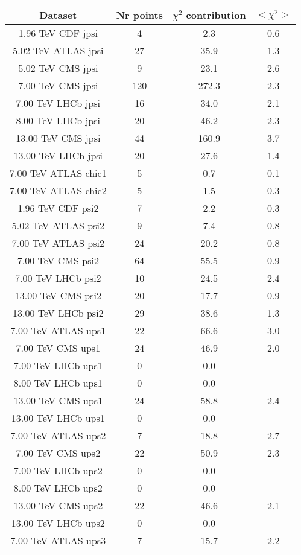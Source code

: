 \begin{table}[h!]
\centering
\begin{tabular}{c|c|c|c}
Dataset & Nr points & $\chi^2$ contribution & $<\chi^2>$ \\
\hline
1.96 TeV CDF jpsi & 4 & 2.3 & 0.6 \\
5.02 TeV ATLAS jpsi & 27 & 35.9 & 1.3 \\
5.02 TeV CMS jpsi & 9 & 23.1 & 2.6 \\
7.00 TeV CMS jpsi & 120 & 272.3 & 2.3 \\
7.00 TeV LHCb jpsi & 16 & 34.0 & 2.1 \\
8.00 TeV LHCb jpsi & 20 & 46.2 & 2.3 \\
13.00 TeV CMS jpsi & 44 & 160.9 & 3.7 \\
13.00 TeV LHCb jpsi & 20 & 27.6 & 1.4 \\
7.00 TeV ATLAS chic1 & 5 & 0.7 & 0.1 \\
7.00 TeV ATLAS chic2 & 5 & 1.5 & 0.3 \\
1.96 TeV CDF psi2 & 7 & 2.2 & 0.3 \\
5.02 TeV ATLAS psi2 & 9 & 7.4 & 0.8 \\
7.00 TeV ATLAS psi2 & 24 & 20.2 & 0.8 \\
7.00 TeV CMS psi2 & 64 & 55.5 & 0.9 \\
7.00 TeV LHCb psi2 & 10 & 24.5 & 2.4 \\
13.00 TeV CMS psi2 & 20 & 17.7 & 0.9 \\
13.00 TeV LHCb psi2 & 29 & 38.6 & 1.3 \\
7.00 TeV ATLAS ups1 & 22 & 66.6 & 3.0 \\
7.00 TeV CMS ups1 & 24 & 46.9 & 2.0 \\
7.00 TeV LHCb ups1 & 0 & 0.0 &  \\
8.00 TeV LHCb ups1 & 0 & 0.0 &  \\
13.00 TeV CMS ups1 & 24 & 58.8 & 2.4 \\
13.00 TeV LHCb ups1 & 0 & 0.0 &  \\
7.00 TeV ATLAS ups2 & 7 & 18.8 & 2.7 \\
7.00 TeV CMS ups2 & 22 & 50.9 & 2.3 \\
7.00 TeV LHCb ups2 & 0 & 0.0 &  \\
8.00 TeV LHCb ups2 & 0 & 0.0 &  \\
13.00 TeV CMS ups2 & 22 & 46.6 & 2.1 \\
13.00 TeV LHCb ups2 & 0 & 0.0 &  \\
7.00 TeV ATLAS ups3 & 7 & 15.7 & 2.2 \\

\end{tabular}
\end{table}
